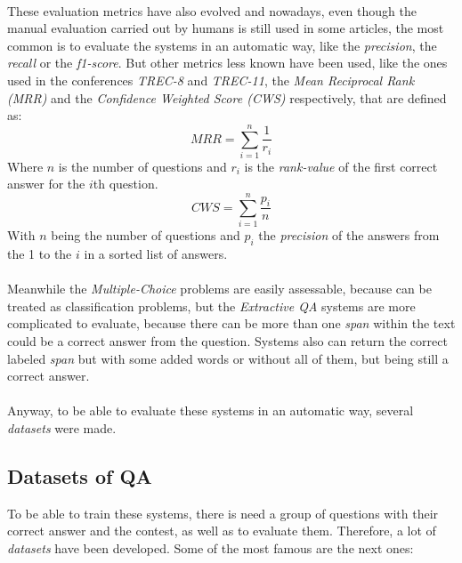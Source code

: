 \paragraph{}
These evaluation metrics have also evolved and nowadays, even though the manual evaluation carried out by humans is still used in some articles, the most common is to evaluate the systems in an automatic way, like the \emph{precision}, the \emph{recall} or the \emph{f1-score}. But other metrics less known have been used, like the ones used in the conferences \emph{TREC-8} and \emph{TREC-11}, the \emph{Mean Reciprocal Rank (MRR)} and the \emph{Confidence Weighted Score (CWS)} respectively, that are defined as:
\begin{equation}
MRR = \sum_{i=1}^{n}\frac{1}{r_{i}}
\label{eq:mrr}
\end{equation}
Where $n$ is the number of questions and $r_{i}$ is the \emph{rank-value} of the first correct answer for the $i$th question.
\begin{equation}
CWS = \sum_{i=1}^{n}\frac{p_{i}}{n}
\label{eq:cws}
\end{equation}
With $n$ being the number of questions and $p_{i}$ the \emph{precision} of the answers from the 1 to the $i$ in a sorted list of answers.
\paragraph{}
Meanwhile the \emph{Multiple-Choice} problems are easily assessable, because can be treated as classification problems, but the \emph{Extractive QA} systems are more complicated to evaluate, because there can be more than one \emph{span} within the text could be a correct answer from the question. Systems also can return the correct labeled \emph{span} but with some added words or without all of them, but being still a correct answer.
\paragraph{}
Anyway, to be able to evaluate these systems in an automatic way, several \emph{datasets} were made.
\subsection{Datasets of QA}
\label{sec:qa-datasets}
To be able to train these systems, there is need a group of questions with their correct answer and the contest, as well as to evaluate them. Therefore, a lot of \emph{datasets} have been developed. Some of the most famous are the next ones:
